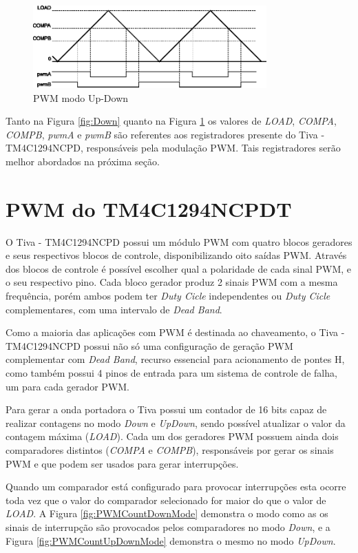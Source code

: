 \begin{figure}[H]
	\centering
	\includegraphics[width=0.8\textwidth] {figuras/UpDown.eps}
	\caption{PWM modo Up-Down \cite{DATASHEET_TIVA}}
	\label{fig:UpDown}
\end{figure}

Tanto na Figura \ref{fig:Down} quanto na Figura \ref{fig:UpDown} os valores de \emph{LOAD}, \emph{COMPA}, \emph{COMPB}, \emph{pwmA} e \emph{pwmB} são referentes aos registradores presente do Tiva - TM4C1294NCPD, responsáveis pela modulação PWM. Tais registradores serão melhor abordados na próxima seção.  

\section{PWM do TM4C1294NCPDT}

O Tiva - TM4C1294NCPD possui um módulo PWM com quatro blocos geradores e seus respectivos blocos de controle, disponibilizando oito saídas PWM.  Através dos blocos de controle é possível escolher qual a polaridade de cada sinal PWM, e o seu respectivo pino. Cada bloco gerador produz 2 sinais PWM com a mesma frequência, porém ambos podem ter \emph{Duty Cicle} independentes ou \emph{Duty Cicle} complementares, com uma intervalo de \emph{Dead Band}. 

Como a maioria das aplicações com PWM é destinada ao chaveamento, o Tiva - TM4C1294NCPD possui não só uma configuração de geração PWM complementar com \emph{Dead Band}, recurso essencial para acionamento de pontes H, como também possui 4 pinos de entrada para um sistema de controle de falha, um para cada gerador PWM.

Para gerar a onda portadora o Tiva possui um contador de 16 bits capaz de realizar contagens no modo \emph{Down} e \emph{UpDown}, sendo possível atualizar o valor da contagem máxima (\emph{LOAD}). Cada um dos geradores PWM possuem ainda dois comparadores distintos (\emph{COMPA} e \emph{COMPB}), responsáveis por gerar os sinais PWM e que podem ser usados para gerar interrupções. 

Quando um comparador está configurado para provocar interrupções esta ocorre toda vez que o valor do comparador selecionado for maior do que o valor de \emph{LOAD}.  A Figura \ref{fig:PWMCountDownMode} demonstra o modo como as os sinais de interrupção são provocados pelos comparadores no modo \emph{Down}, e a Figura \ref{fig:PWMCountUpDownMode} demonstra o mesmo no modo \emph{UpDown}.

